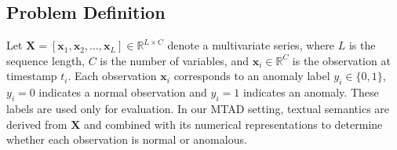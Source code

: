 \documentclass[letterpaper]{article} %
\begin{document}
\subsection{Problem Definition}
Let $\mathbf{X}=[\mathbf{x}_1,\mathbf{x}_2,\ldots,\mathbf{x}_L]\in\mathbb{R}^{L\times C}$ denote a multivariate series, where $L$ is the sequence length, $C$ is the number of variables, and $\mathbf{x}_i\in\mathbb{R}^{C}$ is the observation at timestamp $t_i$. Each observation $\mathbf{x}_i$ corresponds to an anomaly label $y_i\in\{0,1\}$, $y_i=0$ indicates a normal observation and $y_i=1$ indicates an anomaly. These labels are used only for evaluation. In our MTAD setting, textual semantics are derived from $\mathbf{X}$ and combined with its numerical representations to determine whether each observation is normal or anomalous.
\end{document}
